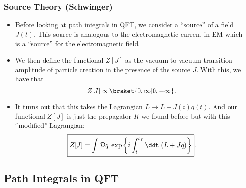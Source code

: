 \subsubsection*{Source Theory (Schwinger)}
\begin{itemize}
    \item Before looking at path integrals in QFT, we consider a ``source'' of a field $J(t)$. This source is analogous to the electromagnetic current in EM which is a ``source'' for the electromagnetic field.
    \item We then define the functional $Z[J]$ as the vacuum-to-vacuum transition amplitude of particle creation in the presence of the source $J$. With this, we have that
        \begin{equation}
            Z[J] \propto \braket{0,\infty | 0,-\infty}.
        \end{equation}
    \item It turns out that this takes the Lagrangian $L \rightarrow L + J(t)q(t)$. And our functional $Z[J]$ is just the propagator $K$ we found before but with this ``modified'' Lagrangian:
        \begin{equation}
            \boxed{Z[J] = \int\mathcal{D}q \; \exp\left\{ i\int_{t_i}^{t_f} \ddt \;(L + Jq) \right\}}.
        \end{equation}
\end{itemize}



\subsection*{Path Integrals in QFT}

